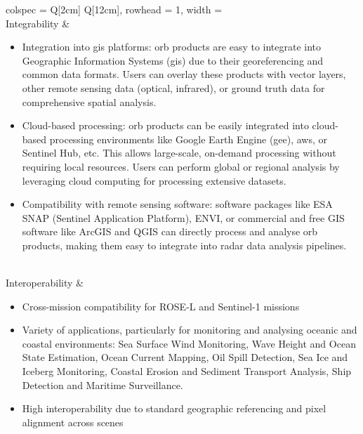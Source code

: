 \begin{longtblr}[
  caption = {Usability, Integrability, and Interoperability of \acs{orb} product},
  label = {tab:orb_usability_integrability_interoperability},
]{
  colspec = {Q[2cm] Q[12cm]},
  rowhead = 1,
  width = \linewidth
}
\\
Integrability &
\begin{itemize}
    \item Integration into \acs{gis} platforms: \acs{orb} products are easy to integrate into Geographic Information Systems (\acs{gis}) due to their georeferencing and common data formats. Users can overlay these products with vector layers, other remote sensing data (optical, infrared), or ground truth data for comprehensive spatial analysis.
    \item Cloud-based processing: \acs{orb} products can be easily integrated into cloud-based processing environments like Google Earth Engine (\acs{gee}), \acs{aws}, or Sentinel Hub, etc. This allows large-scale, on-demand processing without requiring local resources. Users can perform global or regional analysis by leveraging cloud computing for processing extensive datasets.
    \item Compatibility with remote sensing software: software packages like ESA SNAP (Sentinel Application Platform), ENVI, or commercial and free GIS software like ArcGIS and QGIS can directly process and analyse \acs{orb} products, making them easy to integrate into radar data analysis pipelines.
\end{itemize}
\\
Interoperability &
\begin{itemize}
  \item Cross-mission compatibility for ROSE-L and Sentinel-1 missions
  \item Variety of applications, particularly for monitoring and analysing oceanic and coastal environments: Sea Surface Wind Monitoring, Wave Height and Ocean State Estimation, Ocean Current Mapping, Oil Spill Detection, Sea Ice and Iceberg Monitoring, Coastal Erosion and Sediment Transport Analysis, Ship Detection and Maritime Surveillance.
  \item High interoperability due to standard geographic referencing and pixel alignment across scenes
\end{itemize}
\\
\hline
\end{longtblr}

